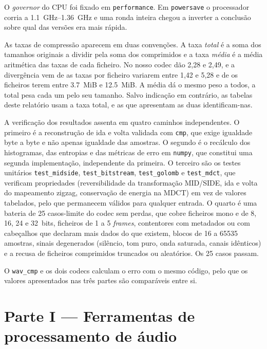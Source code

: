 \documentclass[a4paper,11pt]{article}
\newcommand{\prog}[1]{\texttt{#1}}
\begin{document}
O \emph{governor} do CPU foi fixado em \texttt{performance}.
Em \texttt{powersave} o processador corria a \SIrange{1,1}{1,36}{\giga\hertz} e
uma ronda inteira chegou a inverter a conclusão sobre qual das versões era mais
rápida.

As taxas de compressão aparecem em duas convenções. A taxa \emph{total} é a soma
dos tamanhos originais a dividir pela soma dos comprimidos e a taxa \emph{média} é
a média aritmética das taxas de cada ficheiro. No nosso codec dão 2,28 e 2,49, e
a divergência vem de as taxas por ficheiro variarem entre 1,42 e 5,28 e de os
ficheiros terem entre \SI{3,7}{MiB} e \SI{12,5}{MiB}. A média dá o mesmo peso a
todos, a total pesa cada um pelo seu tamanho. Salvo indicação em contrário, as
tabelas deste relatório usam a taxa total, e as que apresentam as duas
identificam-nas.

A verificação dos resultados assenta em quatro caminhos independentes. O
primeiro é a reconstrução de ida e volta validada com \prog{cmp}, que exige
igualdade byte a byte e não apenas igualdade das amostras. O segundo é o
recálculo dos histogramas, das entropias e das métricas de erro em \prog{numpy},
que constitui uma segunda implementação, independente da primeira. O terceiro
são os testes unitários \prog{test\_midside}, \prog{test\_bitstream},
\prog{test\_golomb} e \prog{test\_mdct}, que verificam propriedades
(reversibilidade da transformação MID/SIDE, ida e volta do mapeamento zigzag,
conservação de energia na MDCT) em vez de valores tabelados, pelo que
permanecem válidos para qualquer entrada. O quarto é uma bateria de 25
casos-limite do codec sem perdas, que cobre ficheiros mono e de 8, 16, 24 e
\num{32}~bits, ficheiros de 1 a 5 \emph{frames}, contentores com metadados ou
com cabeçalhos que declaram mais dados do que existem, blocos de 16 a
\num{65535} amostras, sinais degenerados (silêncio, tom puro, onda saturada,
canais idênticos) e a recusa de ficheiros comprimidos truncados ou aleatórios.
Os 25 casos passam.

O \prog{wav\_cmp} e os dois codecs calculam o erro com o mesmo código, pelo que
os valores apresentados nas três partes são comparáveis entre si.

\section{Parte I --- Ferramentas de processamento de áudio}
\label{sec:parte1}
\end{document}
